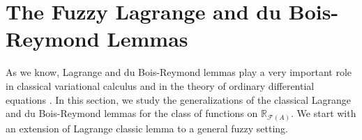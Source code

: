 \documentclass[12pt,a4paper]{article}
\newcommand{\RR}{\mathbb{R}}
\newcommand{\RFA}{\mathbb{R}_{\mathcal{F}(A)}}
\newtheorem{definition}{Definition}
\newtheorem{proposition}{Proposition}
\begin{document}

%

\section{The Fuzzy Lagrange and du Bois-Reymond Lemmas}\label{sec:lemmas}
\noindent

As we know, Lagrange and du Bois-Reymond lemmas play a very important role in classical variational calculus and in the theory of ordinary differential equations \cite{GB,PC,E,Hes66,Logan}. In this section, we study the generalizations of the classical Lagrange and du Bois-Reymond lemmas for the class of functions on $\RFA$. We start with an extension of Lagrange classic lemma to a general fuzzy setting. 
\end{document}
